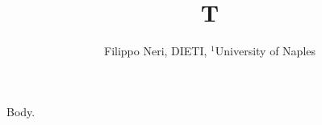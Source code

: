 \documentclass{article}
\begin{document}
\title{T}
\author{Filippo Neri, DIETI, $^1$University of Naples}
\maketitle
Body.
\end{document}
